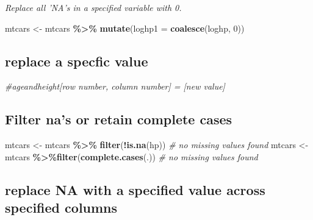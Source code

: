 \documentclass[
]{article}
\newenvironment{Shaded}{\begin{snugshade}}{\end{snugshade}}
\newcommand{\AttributeTok}[1]{\textcolor[rgb]{0.13,0.29,0.53}{#1}}
\newcommand{\CommentTok}[1]{\textcolor[rgb]{0.56,0.35,0.01}{\textit{#1}}}
\newcommand{\DecValTok}[1]{\textcolor[rgb]{0.00,0.00,0.81}{#1}}
\newcommand{\FunctionTok}[1]{\textcolor[rgb]{0.13,0.29,0.53}{\textbf{#1}}}
\newcommand{\NormalTok}[1]{#1}
\newcommand{\OtherTok}[1]{\textcolor[rgb]{0.56,0.35,0.01}{#1}}
\newcommand{\SpecialCharTok}[1]{\textcolor[rgb]{0.81,0.36,0.00}{\textbf{#1}}}
\begin{document}
\emph{Replace all 'NA's in a specified variable with 0.}

\begin{Shaded}
\begin{Highlighting}[]
\NormalTok{mtcars }\OtherTok{\textless{}{-}}\NormalTok{ mtcars }\SpecialCharTok{\%\textgreater{}\%} \FunctionTok{mutate}\NormalTok{(}\AttributeTok{loghp1 =} \FunctionTok{coalesce}\NormalTok{(loghp, }\DecValTok{0}\NormalTok{))}
\end{Highlighting}
\end{Shaded}

\hypertarget{replace-a-specfic-value}{%
\subsection{replace a specfic value}\label{replace-a-specfic-value}}

\begin{Shaded}
\begin{Highlighting}[]
\CommentTok{\#ageandheight[row number, column number] = [new value]}
\end{Highlighting}
\end{Shaded}

\hypertarget{filter-nas-or-retain-complete-cases}{%
\subsection{Filter na's or retain complete cases}\label{filter-nas-or-retain-complete-cases}}

\begin{Shaded}
\begin{Highlighting}[]
\NormalTok{mtcars }\OtherTok{\textless{}{-}}\NormalTok{ mtcars }\SpecialCharTok{\%\textgreater{}\%} \FunctionTok{filter}\NormalTok{(}\SpecialCharTok{!}\FunctionTok{is.na}\NormalTok{(hp)) }\CommentTok{\# no missing values found}
\NormalTok{mtcars }\OtherTok{\textless{}{-}}\NormalTok{ mtcars }\SpecialCharTok{\%\textgreater{}\%}\FunctionTok{filter}\NormalTok{(}\FunctionTok{complete.cases}\NormalTok{(.)) }\CommentTok{\# no missing values found}
\end{Highlighting}
\end{Shaded}

\hypertarget{replace-na-with-a-specified-value-across-specified-columns}{%
\subsection{replace NA with a specified value across specified columns}\label{replace-na-with-a-specified-value-across-specified-columns}}
\end{document}
